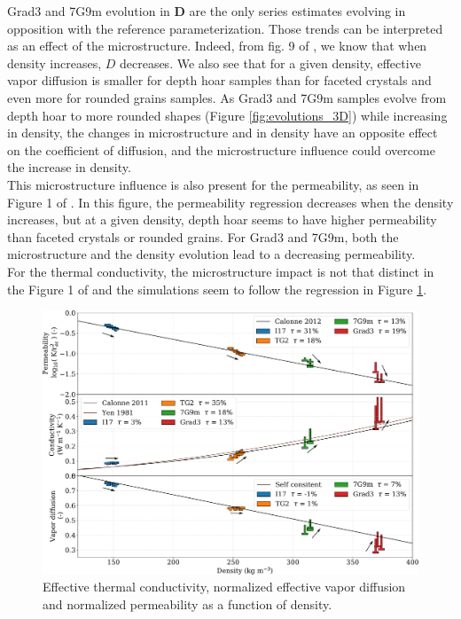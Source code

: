 \documentclass[draft,ms]{agujournal2019}
\begin{document}
Grad3 and 7G9m evolution in \textbf{D} are the only series estimates evolving in opposition with the reference parameterization. Those trends can be interpreted as an effect of the microstructure. Indeed, from fig. 9 of , we know that when density increases, $D$ decreases. We also see that for a given density, effective vapor diffusion is smaller for depth hoar samples than for faceted crystals and even more for rounded grains samples. As Grad3 and 7G9m samples evolve from depth hoar to more rounded shapes (Figure \ref{fig:evolutions_3D}) while increasing in density, the changes in microstructure and in density have an opposite effect on the coefficient of diffusion, and the microstructure influence could overcome the increase in density. \\
This microstructure influence is also present for the permeability, as seen in Figure 1 of . In this figure, the permeability regression decreases when the density increases, but at a given density, depth hoar seems to have higher permeability than faceted crystals or rounded grains. For Grad3 and 7G9m, both the microstructure and the density evolution lead to a decreasing permeability.\\
For the thermal conductivity, the microstructure impact is not that distinct in the Figure 1 of  and the simulations seem to follow the regression in Figure \ref{fig:Tplot}.


\begin{figure}
    \centering
    \includegraphics[width=\linewidth]{Figures/tplot_all_arrows.pdf}
    \caption{Effective thermal conductivity, normalized effective vapor diffusion and normalized permeability as a function of density.}
    \label{fig:Tplot}
\end{figure}
\end{document}
